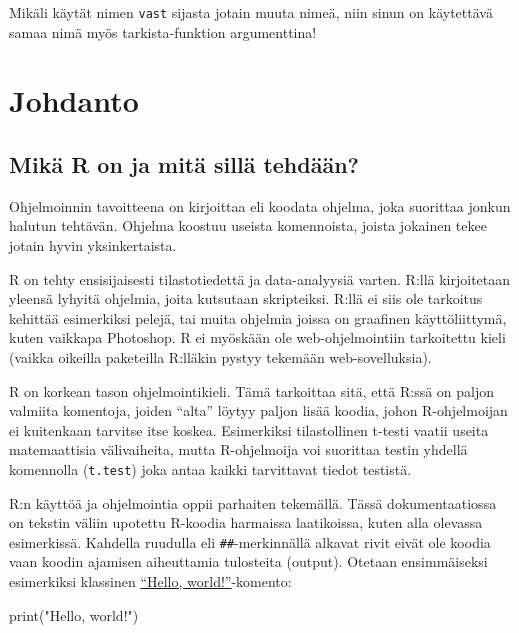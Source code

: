 \documentclass[
]{book}
\newenvironment{Shaded}{\begin{snugshade}}{\end{snugshade}}
\newcommand{\FunctionTok}[1]{\textcolor[rgb]{0.00,0.00,0.00}{#1}}
\newcommand{\NormalTok}[1]{#1}
\newcommand{\StringTok}[1]{\textcolor[rgb]{0.31,0.60,0.02}{#1}}
\begin{document}
Mikäli käytät nimen \texttt{vast} sijasta jotain muuta nimeä, niin sinun on käytettävä samaa nimä myös tarkista-funktion argumenttina!

\hypertarget{intro}{%
\chapter{Johdanto}\label{intro}}

\hypertarget{what_R}{%
\section{Mikä R on ja mitä sillä tehdään?}\label{what_R}}

Ohjelmoinnin tavoitteena on kirjoittaa eli koodata ohjelma, joka suorittaa jonkun halutun tehtävän. Ohjelma koostuu useista komennoista, joista jokainen tekee jotain hyvin yksinkertaista.

R on tehty ensisijaisesti tilastotiedettä ja data-analyysiä varten. R:llä kirjoitetaan yleensä lyhyitä ohjelmia, joita kutsutaan skripteiksi. R:llä ei siis ole tarkoitus kehittää esimerkiksi pelejä, tai muita ohjelmia joissa on graafinen käyttöliittymä, kuten vaikkapa Photoshop. R ei myöskään ole web-ohjelmointiin tarkoitettu kieli (vaikka oikeilla paketeilla R:lläkin pystyy tekemään web-sovelluksia).

R on korkean tason ohjelmointikieli. Tämä tarkoittaa sitä, että R:ssä on paljon valmiita komentoja, joiden ``alta'' löytyy paljon lisää koodia, johon R-ohjelmoijan ei kuitenkaan tarvitse itse koskea. Esimerkiksi tilastollinen t-testi vaatii useita matemaattisia välivaiheita, mutta R-ohjelmoija voi suorittaa testin yhdellä komennolla (\texttt{t.test}) joka antaa kaikki tarvittavat tiedot testistä.

R:n käyttöä ja ohjelmointia oppii parhaiten tekemällä. Tässä dokumentaatiossa on tekstin väliin upotettu R-koodia harmaissa laatikoissa, kuten alla olevassa esimerkissä. Kahdella ruudulla eli \texttt{\#\#}-merkinnällä alkavat rivit eivät ole koodia vaan koodin ajamisen aiheuttamia tulosteita (output). Otetaan ensimmäiseksi esimerkiksi klassinen \href{https://en.wikipedia.org/wiki/\%22Hello,_World!\%22_program}{``Hello, world!''}-komento:

\begin{Shaded}
\begin{Highlighting}[]
\FunctionTok{print}\NormalTok{(}\StringTok{"Hello, world!"}\NormalTok{)}
\end{Highlighting}
\end{Shaded}
\end{document}
